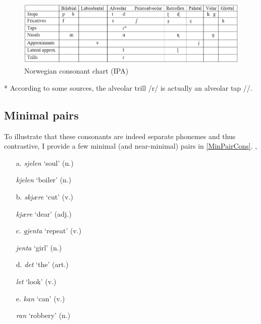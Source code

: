\documentclass{article}
\begin{document}
\begin{figure}[h]
    \centering
    \includegraphics[scale=.55]{images/consonants.PNG}
    \caption{Norwegian consonant chart (IPA)}
    \label{ConsChart}
\end{figure}

* According to some sources, the alveolar trill /r/ is actually an alveolar tap /\textfishhookr/. \cite{TheGermanicLanguages}

\subsection{Minimal pairs}
To illustrate that these consonants are indeed separate phonemes and thus contrastive, I provide a few minimal (and near-minimal) pairs in \ref{MinPairCons}. \cite{RhinoSpike}, \cite{Norwegian101}

\begin{exe}
    \ex
    \label{MinPairCons}
    \begin{multicols}{2}
    \begin{itemize}
        \item [a.] \textit{sjelen}  `soul' (n.)
        \item [] \textit{kjelen}  `boiler' (n.)
        \item [b.] \textit{skjære}  `cut' (v.)
        \item [] \textit{kjære}  `dear' (adj.)
        \item [c.] \textit{gjenta}  `repeat' (v.)
        \item [] \textit{jenta}  `girl' (n.)\columnbreak
        \item [d.] \textit{det}  `the' (art.)
        \item [] \textit{let}  `look' (v.)
        \item [e.] \textit{kan}  `can' (v.)
        \item [] \textit{ran}  `robbery' (n.)
    \end{itemize}
    \end{multicols}
\end{exe}
\end{document}
